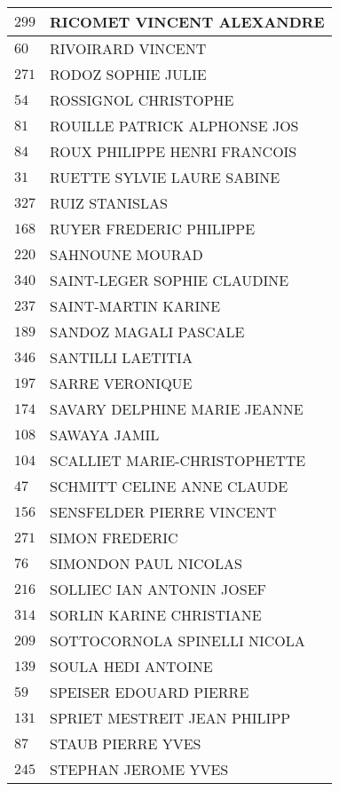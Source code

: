 \begin{xltabular}{\linewidth}{|l|X|}
    \hline
    $299$ & RICOMET VINCENT ALEXANDRE \\
    \hline
    $60$ & RIVOIRARD VINCENT \\
    \hline
    $271$ & RODOZ SOPHIE JULIE \\
    \hline
    $54$ & ROSSIGNOL CHRISTOPHE \\
    \hline
    $81$ & ROUILLE PATRICK ALPHONSE JOS \\
    \hline
    $84$ & ROUX PHILIPPE HENRI FRANCOIS \\
    \hline
    $31$ & RUETTE SYLVIE LAURE SABINE \\
    \hline
    $327$ & RUIZ STANISLAS \\
    \hline
    $168$ & RUYER FREDERIC PHILIPPE \\
    \hline
    $220$ & SAHNOUNE MOURAD \\
    \hline
    $340$ & SAINT-LEGER SOPHIE CLAUDINE \\
    \hline
    $237$ & SAINT-MARTIN KARINE \\
    \hline
    $189$ & SANDOZ MAGALI PASCALE \\
    \hline
    $346$ & SANTILLI LAETITIA \\
    \hline
    $197$ & SARRE VERONIQUE \\
    \hline
    $174$ & SAVARY DELPHINE MARIE JEANNE \\
    \hline
    $108$ & SAWAYA JAMIL \\
    \hline
    $104$ & SCALLIET MARIE-CHRISTOPHETTE \\
    \hline
    $47$ & SCHMITT CELINE ANNE CLAUDE \\
    \hline
    $156$ & SENSFELDER PIERRE VINCENT \\
    \hline
    $271$ & SIMON FREDERIC \\
    \hline
    $76$ & SIMONDON PAUL NICOLAS \\
    \hline
    $216$ & SOLLIEC IAN ANTONIN JOSEF \\
    \hline
    $314$ & SORLIN KARINE CHRISTIANE \\
    \hline
    $209$ & SOTTOCORNOLA SPINELLI NICOLA \\
    \hline
    $139$ & SOULA HEDI ANTOINE \\
    \hline
    $59$ & SPEISER EDOUARD PIERRE \\
    \hline
    $131$ & SPRIET MESTREIT JEAN PHILIPP \\
    \hline
    $87$ & STAUB PIERRE YVES \\
    \hline
    $245$ & STEPHAN JEROME YVES \\

\end{xltabular}
